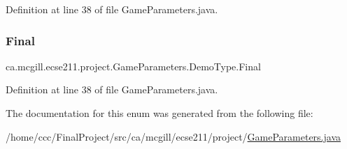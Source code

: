 Definition at line 38 of file Game\+Parameters.\+java.

\mbox{\label{enumca_1_1mcgill_1_1ecse211_1_1project_1_1_game_parameters_1_1_demo_type_a1ba3e060bfd5f76af77b713321abc7f6}} 
\subsubsection{\texorpdfstring{Final}{Final}}
{\footnotesize\ttfamily ca.\+mcgill.\+ecse211.\+project.\+Game\+Parameters.\+Demo\+Type.\+Final}



Definition at line 38 of file Game\+Parameters.\+java.



The documentation for this enum was generated from the following file\+:\begin{DoxyCompactItemize}
\item 
/home/ccc/\+Final\+Project/src/ca/mcgill/ecse211/project/\hyperlink{_game_parameters_8java}{Game\+Parameters.\+java}\end{DoxyCompactItemize}
